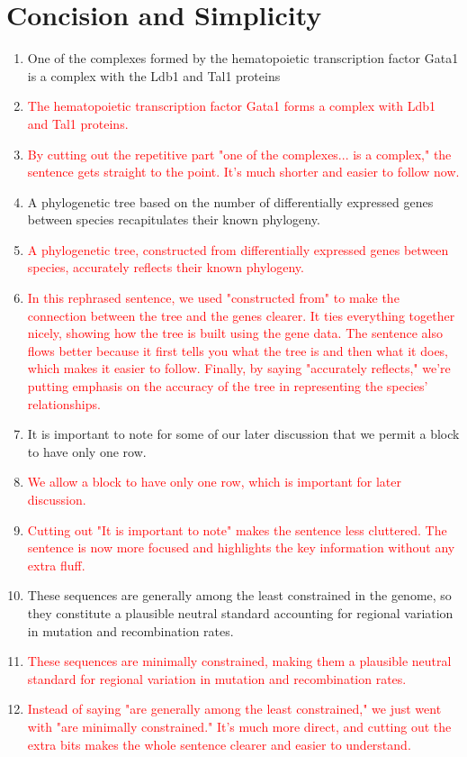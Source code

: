 \documentclass{article}
\newcommand{\red}[1]{\textcolor{red}{#1}}
\begin{document}
\section{Concision and Simplicity}
\begin{enumerate}
    
    \item One of the complexes formed by the hematopoietic transcription factor Gata1 is a complex with the Ldb1 and Tal1 proteins
    \item[] \red{The hematopoietic transcription factor Gata1 forms a complex with Ldb1 and Tal1 proteins.}
    \item[] \red{By cutting out the repetitive part "one of the complexes... is a complex," the sentence gets straight to the point. It's much shorter and easier to follow now.}
    
    \item A phylogenetic tree based on the number of differentially expressed genes between species recapitulates their known phylogeny.
    \item[] \red{A phylogenetic tree, constructed from differentially expressed genes between species, accurately reflects their known phylogeny.}
    \item[] \red{In this rephrased sentence, we used "constructed from" to make the connection between the tree and the genes clearer. It ties everything together nicely, showing how the tree is built using the gene data. The sentence also flows better because it first tells you what the tree is and then what it does, which makes it easier to follow. Finally, by saying "accurately reflects," we’re putting emphasis on the accuracy of the tree in representing the species’ relationships.}
    
    \item It is important to note for some of our later discussion that we permit a block to have only one row. 
    \item[] \red{We allow a block to have only one row, which is important for later discussion.}
    \item[] \red{Cutting out "It is important to note" makes the sentence less cluttered. The sentence is now more focused and highlights the key information without any extra fluff.}
    
    \item These sequences are generally among the least constrained in the genome, so they constitute a plausible neutral standard accounting for regional variation in mutation and recombination rates.
    \item[] \red{These sequences are minimally constrained, making them a plausible neutral standard for regional variation in mutation and recombination rates.}
    \item[] \red{Instead of saying "are generally among the least constrained," we just went with "are minimally constrained." It’s much more direct, and cutting out the extra bits makes the whole sentence clearer and easier to understand.}
    
\end{enumerate}
\end{document}
